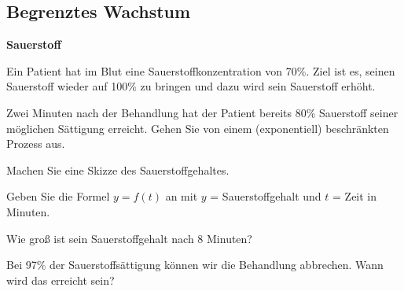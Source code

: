 
\subsection{Begrenztes Wachstum}






\bbwActAufgabenNr{} \textbf{Sauerstoff}

Ein Patient hat im Blut eine Sauerstoffkonzentration von 70\%. Ziel
ist es, seinen Sauerstoff wieder auf 100\% zu bringen und dazu wird
sein Sauerstoff erhöht.

Zwei Minuten nach der Behandlung hat der Patient bereits 80\%
Sauerstoff seiner möglichen Sättigung erreicht. Gehen Sie von einem
(exponentiell) beschränkten Prozess aus.

\begin{bbwAufgabenBlock}


\item Machen Sie eine Skizze des Sauerstoffgehaltes.

  
\item Geben Sie die Formel $y = f(t)$ an mit $y$ = Sauerstoffgehalt und
$t$ = Zeit in Minuten.

  
\item Wie groß ist sein Sauerstoffgehalt nach 8 Minuten?

  
\item
  Bei 97\% der Sauerstoffsättigung können wir die Behandlung
abbrechen. Wann wird das erreicht sein?


\end{bbwAufgabenBlock}


\platzFuerBerechnungenBisEndeSeite{}


